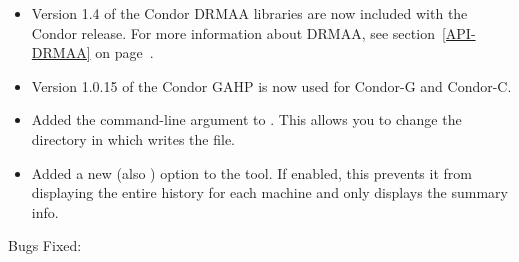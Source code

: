 \begin{itemize}

\item Version 1.4 of the Condor DRMAA libraries are now included 
  with the Condor release.
  For more information about DRMAA, see section~\ref{API-DRMAA} on
  page~\pageref{API-DRMAA}.

\item Version 1.0.15 of the Condor GAHP is now used for Condor-G and
  Condor-C. 

\item Added the  command-line argument to
.  This allows you to change the directory in which
 writes the  file.

\item Added a new  (also ) option to the
 tool.  If enabled, this prevents it from
displaying the entire history for each machine and only displays the
summary info.

\end{itemize}

\noindent Bugs Fixed:

